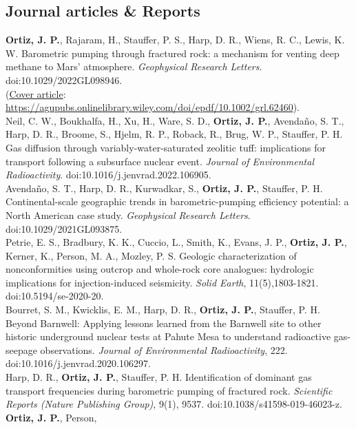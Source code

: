 \documentclass[11pt, letterpaper]{article}
\newcommand{\years}[1]{\marginnote{\scriptsize #1}}
\begin{document}
\subsection*{Journal articles \& Reports}
\noindent
\years{2022}\textbf{Ortiz, J. P.}, Rajaram, H., Stauffer, P. S., Harp, D. R.,
Wiens, R. C., Lewis, K. W.  Barometric pumping through fractured rock: a
mechanism for venting deep methane to Mars' atmosphere.  \emph{Geophysical
Research Letters}. doi:10.1029/2022GL098946. \\(\underline{Cover article}:
\href{https://agupubs.onlinelibrary.wiley.com/doi/epdf/10.1002/grl.62460}{https://agupubs.onlinelibrary.wiley.com/doi/epdf/10.1002/grl.62460}).\\ 
\years{2022}Neil, C. W., Boukhalfa, H., Xu, H., Ware, S. D., \textbf{Ortiz, J.
P.}, Avendaño, S. T., Harp, D. R., Broome, S., Hjelm, R. P., Roback, R., Brug,
W. P., Stauffer, P. H. Gas diffusion through variably-water-saturated zeolitic
tuff: implications for transport following a subsurface nuclear event.
\emph{Journal of Environmental Radioactivity}.
doi:10.1016/j.jenvrad.2022.106905.\\
\years{2021}Avendaño, S. T., Harp, D. R., Kurwadkar, S., \textbf{Ortiz, J.
P.}, Stauffer, P. H. Continental-scale geographic trends in barometric-pumping
efficiency potential: a North American case study.
\emph{Geophysical Research Letters}.  doi:10.1029/2021GL093875.\\
\years{2020}Petrie, E. S., Bradbury, K. K., Cuccio, L., Smith, K., Evans, J.
P., \textbf{Ortiz, J. P.}, Kerner, K., Person, M. A., Mozley, P. S.
Geologic characterization of nonconformities using outcrop and whole-rock core
analogues: hydrologic implications for injection-induced seismicity.
\emph{Solid Earth}, 11(5),1803-1821. doi:10.5194/se-2020-20.\\
\years{2020}Bourret, S. M., Kwicklis, E. M., Harp, D. R., \textbf{Ortiz, J.
P.}, Stauffer, P. H. Beyond Barnwell: Applying lessons learned from the
Barnwell site to other historic underground nuclear tests at Pahute Mesa to
understand radioactive gas-seepage observations. \emph{Journal of Environmental
Radioactivity}, 222. doi:10.1016/j.jenvrad.2020.106297.\\
\years{2019}Harp, D. R., \textbf{Ortiz, J. P.}, Stauffer, P. H. Identification
of dominant gas transport frequencies during barometric pumping of fractured
rock. \emph{Scientific Reports (Nature Publishing Group)}, 9(1), 9537.
doi:10.1038/s41598-019-46023-z. \\ 
\years{2019}\textbf{Ortiz, J. P.}, Person,
\end{document}
